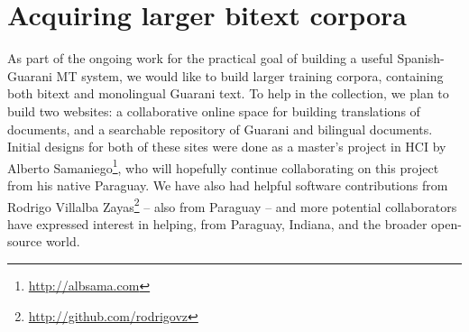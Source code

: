 


\section{Acquiring larger bitext corpora}
\label{sec:crowdsourcing}
As part of the ongoing work for the practical goal of building a useful
Spanish-Guarani MT system, we would like to build larger training corpora,
containing both bitext and monolingual Guarani text.
To help in the collection, we plan to build two websites:
a collaborative online space for building translations of documents, 
and a searchable repository of Guarani and bilingual documents.
Initial designs for both of these sites were done as a master's project in HCI
by Alberto Samaniego\footnote{\url{http://albsama.com}}, who will hopefully
continue collaborating on this project from his native Paraguay.
We have also had helpful software contributions from
Rodrigo Villalba Zayas\footnote{\url{http://github.com/rodrigovz}} --
also from Paraguay -- and more potential collaborators have expressed
interest in helping, from Paraguay, Indiana, and the broader open-source world.

